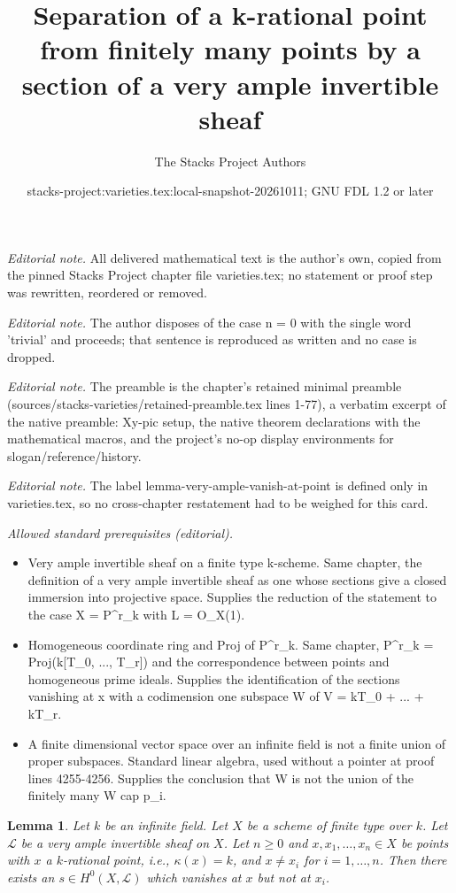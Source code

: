 \documentclass[10pt,a4paper]{amsart}
\title{Separation of a k-rational point from finitely many points by a section of a very ample invertible sheaf}
\author{The Stacks Project Authors}
\date{stacks-project:varieties.tex:local-snapshot-20261011; GNU FDL 1.2 or later}
\theoremstyle{plain}
\newtheorem{lemma}[subsection]{Lemma}
\theoremstyle{definition}
\theoremstyle{remark}
\numberwithin{equation}{subsection}
\begin{document}
\maketitle
\noindent\textit{Editorial note.} All delivered mathematical text is the author's own, copied from the pinned Stacks Project chapter file varieties.tex; no statement or proof step was rewritten, reordered or removed.\par\medskip
\noindent\textit{Editorial note.} The author disposes of the case n = 0 with the single word 'trivial' and proceeds; that sentence is reproduced as written and no case is dropped.\par\medskip
\noindent\textit{Editorial note.} The preamble is the chapter's retained minimal preamble (sources/stacks-varieties/retained-preamble.tex lines 1-77), a verbatim excerpt of the native preamble: Xy-pic setup, the native theorem declarations with the mathematical macros, and the project's no-op display environments for slogan/reference/history.\par\medskip
\noindent\textit{Editorial note.} The label lemma-very-ample-vanish-at-point is defined only in varieties.tex, so no cross-chapter restatement had to be weighed for this card.\par\medskip
\noindent\textit{Allowed standard prerequisites (editorial).}\begin{itemize}
\item Very ample invertible sheaf on a finite type k-scheme. Same chapter, the definition of a very ample invertible sheaf as one whose sections give a closed immersion into projective space. Supplies the reduction of the statement to the case X = P\textasciicircum{}r\_k with L = O\_X(1).
\item Homogeneous coordinate ring and Proj of P\textasciicircum{}r\_k. Same chapter, P\textasciicircum{}r\_k = Proj(k[T\_0, ..., T\_r]) and the correspondence between points and homogeneous prime ideals. Supplies the identification of the sections vanishing at x with a codimension one subspace W of V = kT\_0 + ... + kT\_r.
\item A finite dimensional vector space over an infinite field is not a finite union of proper subspaces. Standard linear algebra, used without a pointer at proof lines 4255-4256. Supplies the conclusion that W is not the union of the finitely many W cap p\_i.
\end{itemize}\medskip
\begin{lemma}
\label{lemma-very-ample-vanish-at-point}
Let $k$ be an infinite field. Let $X$ be a scheme of finite type over $k$.
Let $\mathcal{L}$ be a very ample invertible sheaf on $X$.
Let $n \geq 0$ and $x, x_1, \ldots, x_n \in X$ be points with
$x$ a $k$-rational point, i.e., $\kappa(x) = k$, and
$x \not = x_i$ for $i = 1, \ldots, n$.
Then there exists an $s \in H^0(X, \mathcal{L})$ which vanishes at
$x$ but not at $x_i$.
\end{lemma}
\end{document}

